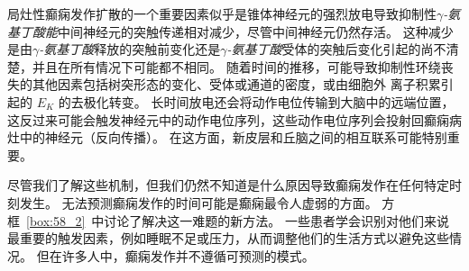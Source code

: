 局灶性癫痫发作扩散的一个重要因素似乎是锥体神经元的强烈放电导致抑制性\textit{$\gamma$-氨基丁酸能}中间神经元的突触传递相对减少，尽管中间神经元仍然存活。
这种减少是由\textit{$\gamma$-氨基丁酸}释放的突触前变化还是\textit{$\gamma$-氨基丁酸}受体的突触后变化引起的尚不清楚，并且在所有情况下可能都不相同。
随着时间的推移，可能导致抑制性环绕丧失的其他因素包括树突形态的变化、受体或通道的密度，或由细胞外  离子积累引起的 $ E_K $ 的去极化转变。
长时间放电还会将动作电位传输到大脑中的远端位置，这反过来可能会触发神经元中的动作电位序列，这些动作电位序列会投射回癫痫病灶中的神经元（反向传播）。
在这方面，新皮层和丘脑之间的相互联系可能特别重要。


尽管我们了解这些机制，但我们仍然不知道是什么原因导致癫痫发作在任何特定时刻发生。
无法预测癫痫发作的时间可能是癫痫最令人虚弱的方面。
方框~\ref{box:58_2}~中讨论了解决这一难题的新方法。
一些患者学会识别对他们来说最重要的触发因素，例如睡眠不足或压力，从而调整他们的生活方式以避免这些情况。
但在许多人中，癫痫发作并不遵循可预测的模式。


